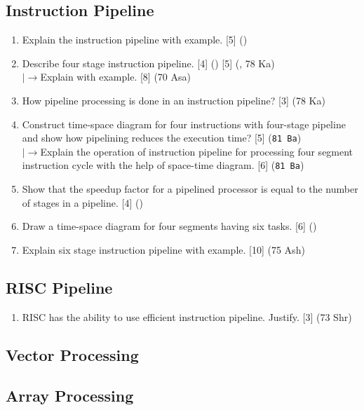 \documentclass[12pt]{article}
\newcommand{\lb}{\\$\left|\rightarrow\right.$}
\begin{document}
	\subsection{Instruction Pipeline}
		\begin{enumerate}
			\item Explain the instruction pipeline with example. \hfill [5] ()

			\item Describe four stage instruction pipeline. \hfill [4] () [5] (, 78 Ka)
			\lb Explain with example. \hfill [8] (70 Asa)
			
			\item How pipeline processing is done in an instruction pipeline? \hfill [3] (78 Ka)

			\item Construct time-space diagram for four instructions with four-stage pipeline and show how pipelining reduces the execution time? \hfill [5] (\texttt{81 Ba})
			\lb Explain the operation of instruction pipeline for processing four segment instruction cycle with the help of space-time diagram. \hfill [6] (\texttt{81 Ba})

			\item Show that the speedup factor for a pipelined processor is equal to the number of stages in a pipeline. \hfill [4] ()

			\item Draw a time-space diagram for four segments having six tasks. \hfill [6] ()

			\item Explain six stage instruction pipeline with example. \hfill [10] (75 Ash)
		\end{enumerate}

	\subsection{RISC Pipeline}
		\begin{enumerate}
			\item RISC has the ability to use efficient instruction pipeline. Justify. \hfill [3] (73 Shr)
		\end{enumerate}

	\subsection{Vector Processing}
	\subsection{Array Processing}
\end{document}
